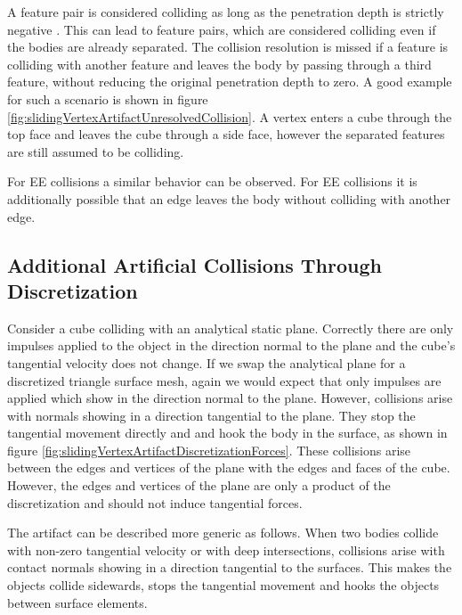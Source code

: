 A feature pair is considered colliding as long as the penetration depth is strictly negative \cite{TANG2012}.
This can lead to feature pairs, which are considered colliding even 
if the bodies are already separated.
The collision resolution is missed if a feature is colliding with another feature and leaves the body by passing through a third feature, without reducing the original penetration depth to zero. A good example for such a scenario is shown in figure \ref{fig:slidingVertexArtifactUnresolvedCollision}. A vertex enters a cube through the top face and leaves the cube through a side face, however the separated features are still assumed to be colliding.

For EE collisions a similar behavior can be observed. For EE collisions it is additionally possible that an edge leaves the body without colliding with another edge.



\subsection{Additional Artificial Collisions Through Discretization}
\label{ss:DiscretizationCollisonForces}

Consider a cube colliding with an analytical static plane. Correctly there are only impulses applied to the object in the direction normal to the plane and the cube's tangential velocity does not change.
If we swap the analytical plane for a discretized triangle surface mesh, again we would expect that only impulses are applied which show in the direction normal to the plane. 
However, collisions arise with normals showing in a direction tangential to the plane. They stop the tangential movement directly and and hook the body in the surface, as shown in figure \ref{fig:slidingVertexArtifactDiscretizationForces}. These collisions arise between the edges and vertices of the plane with the edges and faces of the cube. However, the edges and vertices of the plane are only a product of the discretization and should not induce tangential forces.

The artifact can be described more generic as follows. When two bodies collide with non-zero tangential velocity or with deep intersections, collisions arise with contact normals showing in a direction tangential to the surfaces. This makes the objects collide sidewards, stops the tangential movement and hooks the objects between surface elements.

